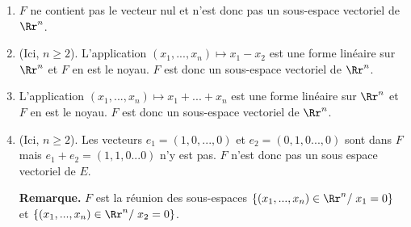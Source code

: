 {{\begin{enumerate}
\begin{itemize}
$F$ est donc un sous-espace vectoriel de $\Rr^n$.

\end{itemize}

\item  $F$ ne contient pas le vecteur nul et n'est donc pas un sous-espace vectoriel de $\Rr^n$.

\item  (Ici, $n\geq2$). L'application $(x_1,...,x_n)\mapsto x_1-x_2$ est une forme linéaire sur $\Rr^n$ et $F$ en
est le noyau. $F$ est donc un sous-espace vectoriel de $\Rr^n$.

\item  L'application $(x_1,...,x_n)\mapsto x_1+...+x_n$ est une forme linéaire sur $\Rr^n$ et $F$ en est le
noyau. $F$ est donc un sous-espace vectoriel de $\Rr^n$.

\item  (Ici, $n\geq2$). Les vecteurs $e_1=(1,0,...,0)$ et $e_2=(0,1,0...,0)$ sont dans $F$ mais $e_1+e_2=
(1,1,0...0)$ n'y est pas. $F$ n'est donc pas un sous espace vectoriel de $E$.

\textbf{Remarque.} $F$ est la réunion des sous-espaces $\{(x_1,...,x_n)\in\Rr^n/\;x_1=0\}$ et
$\{(x_1,...,x_n)\in\Rr^n/\;x_2=0\}$.
\end{enumerate}}
}